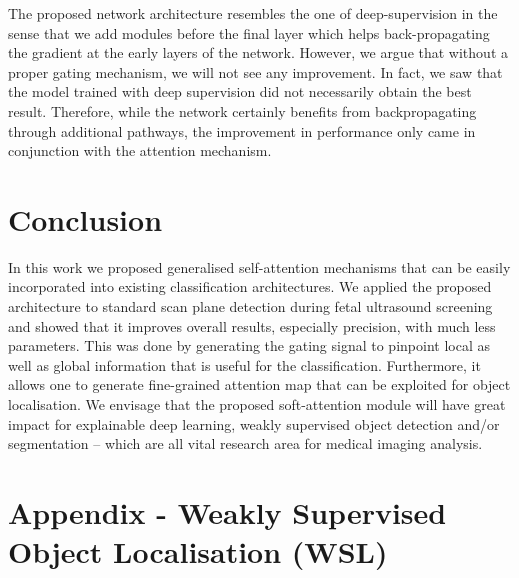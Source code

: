 \documentclass{article}
\begin{document}
The proposed network architecture resembles the one of deep-supervision in the sense that we add modules before the final layer which helps back-propagating the gradient at the early layers of the network. However, we argue that without a proper gating mechanism, we will not see any improvement. In fact, we saw that the model trained with deep supervision did not necessarily obtain the best result. Therefore, while the network certainly benefits from backpropagating through additional pathways, the improvement in performance only came in conjunction with the attention mechanism. 

\section{Conclusion}

In this work we proposed generalised self-attention mechanisms that can be easily incorporated into existing classification architectures. We applied the proposed architecture to standard scan plane detection during fetal ultrasound screening and showed that it improves overall results, especially precision, with much less parameters. This was done by generating the gating signal to pinpoint local as well as global information that is useful for the classification. Furthermore, it allows one to generate fine-grained attention map that can be exploited for object localisation. We envisage that the proposed soft-attention module will have great impact for explainable deep learning, weakly supervised object detection and/or segmentation -- which are all vital research area for medical imaging analysis.  




\newpage

\section{Appendix - Weakly Supervised Object Localisation (WSL)}
\end{document}
